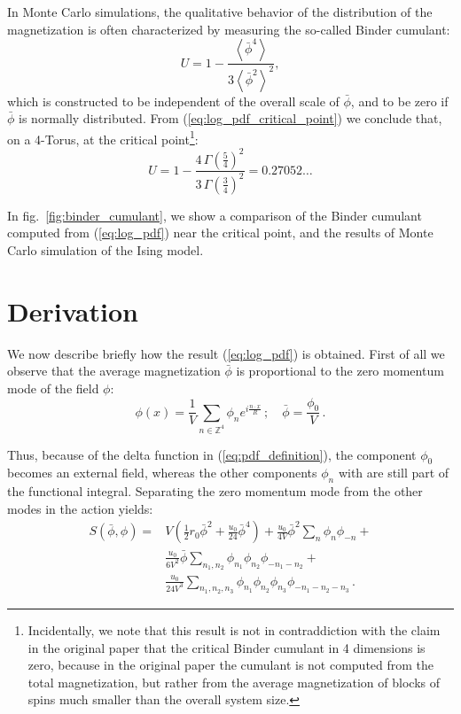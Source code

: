 \documentclass[11pt,a4paper]{article}
\begin{document}
In Monte Carlo simulations, the qualitative behavior of the distribution of the
magnetization is often characterized by measuring the so-called Binder
cumulant:
\begin{equation}
    U = 1 - \frac{\left\langle \bar \phi^4 \right \rangle}
    {3\left\langle \bar \phi^2 \right \rangle^2},
\end{equation}
which is constructed to be independent of the overall scale of $\bar{\phi}$,
and to be zero if $\bar{\phi}$ is normally distributed. From
(\ref{eq:log_pdf_critical_point}) we conclude that, on a 4-Torus, at the
critical point\footnote{ Incidentally, we note that this result is not in
contraddiction with the claim in the original paper that the critical Binder
cumulant in 4 dimensions is zero, because in the original paper the cumulant is
not computed from the total magnetization, but rather from the average
magnetization of blocks of spins much smaller than the overall system size.}:
\begin{equation}
    \label{eq:critical_binder_cumulant}
    U = 1 - \frac{4\,\Gamma\left(\frac{5}{4}\right)^2}
    {3\,\Gamma\left(\frac{3}{4}\right)^2} 
    = 0.27052\ldots
\end{equation}


In fig.~\ref{fig:binder_cumulant}, we show a comparison of the Binder cumulant
computed from (\ref{eq:log_pdf}) near the critical point, and the results of
Monte Carlo simulation of the Ising model.

\section{Derivation}

We now describe briefly how the result (\ref{eq:log_pdf}) is obtained. First of
all we observe that the average magnetization $\bar{\phi}$ is proportional to
the zero momentum mode of the field $\phi$:
\begin{equation}
    \phi(x) = \frac{1}{V} \sum_{n \in \mathbb{Z}^4} \phi_{n} 
    e^{i \frac{n\cdot x}{R}}\,;\quad \bar{\phi} = \frac{\phi_{0}}{V}\,.
\end{equation}

Thus, because of the delta function in (\ref{eq:pdf_definition}), the component
$\phi_{0}$ becomes an external field, whereas the other components $\phi_{n}$
with are still part of the functional integral. Separating the zero momentum
mode from the other modes in the action yields:
\begin{equation}
\begin{split}
    S(\bar{\phi}, \phi) =& 
    V \left(\frac{1}{2} r_0 \bar{\phi}^2 + \frac{u_0}{24} \bar{\phi}^4\right) +
    \frac{u_0}{4V} \bar{\phi}^2 \sum_{n} \phi_{n} \phi_{-n} + \\
    &\frac{u_0}{6V^2} \bar{\phi} 
        \sum_{n_1, n_2} \phi_{n_1} \phi_{n_2} \phi_{-n_1 -n_2} + \\
    &\frac{u_0}{24V^3} \sum_{n_1, n_2, n_3} \phi_{n_1} \phi_{n_2} 
        \phi_{n_3} \phi_{-n_1 -n_2 -n_3}\,.
\end{split}
\end{equation}
\end{document}
